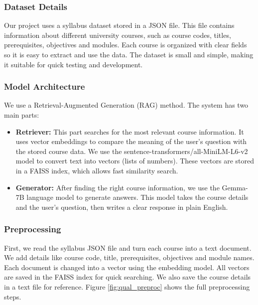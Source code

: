 \documentclass[conference]{IEEEtran}
\begin{document}
\subsubsection{\textbf{Dataset Details}}
Our project uses a syllabus dataset stored in a JSON file. This file contains information about different university courses, such as course codes, titles, prerequisites, objectives and modules. Each course is organized with clear fields so it is easy to extract and use the data. The dataset is small and simple, making it suitable for quick testing and development.

\subsubsection{\textbf{Model Architecture}}
We use a Retrieval-Augmented Generation (RAG) method. The system has two main parts:
\begin{itemize}
    \item \textbf{Retriever:} This part searches for the most relevant course information. It uses vector embeddings to compare the meaning of the user's question with the stored course data. We use the sentence-transformers/all-MiniLM-L6-v2 model to convert text into vectors (lists of numbers). These vectors are stored in a FAISS index, which allows fast similarity search.
    \item \textbf{Generator:} After finding the right course information, we use the Gemma-7B language model to generate answers. This model takes the course details and the user's question, then writes a clear response in plain English.
\end{itemize}

\subsubsection{\textbf{Preprocessing}}
First, we read the syllabus JSON file and turn each course into a text document. We add details like course code, title, prerequisites, objectives and module names. Each document is changed into a vector using the embedding model. All vectors are saved in the FAISS index for quick searching. We also save the course details in a text file for reference. Figure \ref{fig:qual_preproc} shows the full preprocessing steps.
\end{document}
